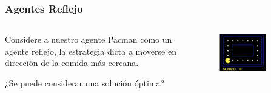 \documentclass[10pt]{beamer}
\begin{document}
\begin{frame}
  \frametitle{Agentes Reflejo}
  \begin{columns}

    \begin{column}{0.4\textwidth}
      Considere a nuestro agente Pacman como un agente reflejo, la estrategia
      dicta a moverse en dirección de la comida más cercana.  
      
      ¿Se puede considerar una solución óptima?
    \end{column}
    
    \begin{column}{0.6\textwidth}
      \begin{figure}[!h] 
        \centering
        \includegraphics[width=0.7\textwidth]{img/pacman1}
      \end{figure}  
    \end{column}

  \end{columns}
\end{frame}
\end{document}

